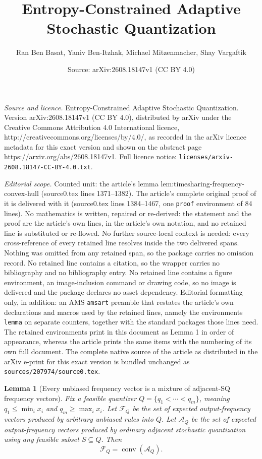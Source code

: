 \documentclass[10pt,a4paper]{amsart}
\title{Entropy-Constrained Adaptive Stochastic Quantization}
\author{Ran Ben Basat, Yaniv Ben-Itzhak, Michael Mitzenmacher, Shay Vargaftik}
\date{Source: arXiv:2608.18147v1 (CC BY 4.0)}
\newtheorem{lemma}{Lemma}
\begin{document}
\maketitle

\noindent\emph{Source and licence.} Entropy-Constrained Adaptive Stochastic Quantization. Version arXiv:2608.18147v1 (CC BY 4.0), distributed by arXiv under the Creative Commons Attribution 4.0 International licence, http://creativecommons.org/licenses/by/4.0/, as recorded in the arXiv licence metadata for this exact version and shown on the abstract page https://arxiv.org/abs/2608.18147v1. Full licence notice: \texttt{licenses/arxiv-2608.18147-CC-BY-4.0.txt}.\par\smallskip

\noindent\textit{Editorial scope.} Counted unit: the article's lemma lem:timesharing-frequency-convex-hull (source0.tex lines 1371--1382). The article's complete original proof of it is delivered with it (source0.tex lines 1384--1467, one \texttt{proof} environment of 84 lines). No mathematics is written, repaired or re-derived: the statement and the proof are the article's own lines, in the article's own notation, and no retained line is substituted or re-flowed.  No further source-local context is needed: every cross-reference of every retained line resolves inside the two delivered spans.  Nothing was omitted from any retained span, so the package carries no omission record.  No retained line contains a citation, so the wrapper carries no bibliography and no bibliography entry.  No retained line contains a figure environment, an image-inclusion command or drawing code, so no image is delivered and the package declares no asset dependency.  Editorial formatting only, in addition: an AMS \texttt{amsart} preamble that restates the article's own declarations and macros used by the retained lines, namely the environments \texttt{lemma} on separate counters, together with the standard packages those lines need.  The retained environments print in this document as Lemma 1 in order of appearance, whereas the article prints the same items with the numbering of its own full document.  The complete native source of the article as distributed in the arXiv e-print for this exact version is bundled unchanged as \texttt{sources/207974/source0.tex}.
\begin{lemma}[Every unbiased frequency vector is a mixture of adjacent-SQ
frequency vectors]\label{lem:timesharing-frequency-convex-hull}
Fix a feasible quantizer $Q=\{q_1<\cdots<q_m\}$, meaning
$q_1\le\min_i x_i$ and $q_m\ge\max_i x_i$. Let $\mathcal{F}_Q$ be the set of
expected output-frequency vectors produced by arbitrary unbiased rules into
$Q$. Let $\mathcal{A}_Q$ be the set of expected output-frequency vectors
produced by ordinary adjacent stochastic quantization using any feasible
subset $S\subseteq Q$. Then
\[
\mathcal{F}_Q=\operatorname{conv}(\mathcal{A}_Q).
\]
\end{lemma}
\end{document}
